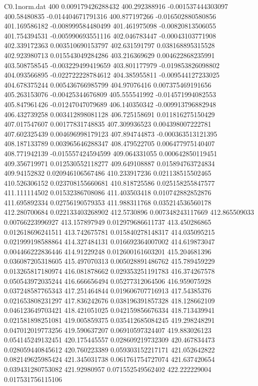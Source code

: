 \begin{filecontents}{C0.1norm.dat}
400		0.009179426288432
400.292388916		-0.001537444303097
400.58480835		-0.014404671791316
400.877197266		-0.016502880580856
401.169586182		-0.008999584480499
401.461975098		-0.00820813506055
401.754394531		-0.005990693551116
402.046783447		-0.00043103771908
402.339172363		0.003510690153797
402.631591797		0.038168895315528
402.923980713		0.015543049284286
403.216369629		0.004622868235991
403.508758545		-0.003229499419659
403.801177979		-0.019853826098802
404.093566895		-0.022722228784612
404.385955811		-0.009544127233025
404.678375244		0.005436766985799
404.97076416		0.007375469191656
405.263153076		-0.00425344676809
405.555541992		-0.014571994082553
405.847961426		-0.01247047079689
406.140350342		-0.009913796882948
406.432739258		0.003412898081128
406.725158691		0.011816275150429
407.017547607		0.00177831748835
407.309936523		0.004398007222781
407.602325439		0.004696998179123
407.894744873		-0.000363513121395
408.187133789		0.003965646288347
408.479522705		0.006477975140407
408.771942139		-0.015557424594599
409.064331055		0.000642850119451
409.356719971		0.012530552118277
409.649108887		0.015894763724834
409.94152832		0.020946106567486
410.233917236		0.021138515502465
410.526306152		0.023708155660681
410.818725586		0.025158255847577
411.111114502		0.01532386708086
411.403503418		0.010742882852876
411.695892334		0.02756190579353
411.988311768		0.035214536560178
412.280700684		0.022133403268902
412.5730896		0.007348243117669
412.865509033		0.00766223996927
413.157897949		0.012979686611737
413.450286865		0.012618696241511
413.742675781		0.015840278148317
414.035095215		0.021999198588864
414.327484131		0.016692364007002
414.619873047		0.004466222836446
414.91229248		0.012600161603201
415.204681396		0.036087205318605
415.497070313		0.005028891486762
415.789459229		0.013265817180974
416.081878662		0.029353251191783
416.374267578		0.050543972035244
416.666656494		0.05277312064506
416.959075928		0.037248587765343
417.251464844		0.019606707716913
417.54385376		0.021653808231297
417.836242676		0.038196391857328
418.128662109		0.046123649703421
418.421051025		0.042159856676334
418.713439941		0.021581898251081
419.005859375		0.035412685084245
419.298248291		0.047012019773256
419.590637207		0.06910597324407
419.883026123		0.054145249132451
420.175445557		0.028609219732309
420.467834473		0.028059440845612
420.760223389		0.059303152217171
421.052642822		0.082149625985424
421.345031738		0.061761754727074
421.637420654		0.039431280753082
421.92980957		0.071552549562402
422.222229004		0.017531756115106

\end{filecontents}
